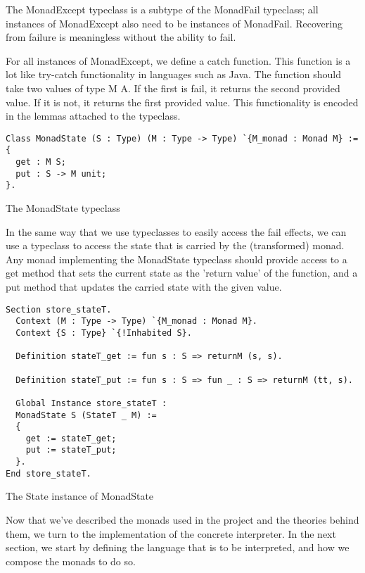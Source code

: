 The MonadExcept typeclass is a subtype of the MonadFail typeclass; all
instances of MonadExcept also need to be instances of MonadFail. Recovering
from failure is meaningless without the ability to fail.

For all instances of MonadExcept, we define a catch function. This function
is a lot like try-catch functionality in languages such as Java. The function
should take two values of type M A. If the first is fail, it returns the
second provided value. If it is not, it returns the first provided value. This
functionality is encoded in the lemmas attached to the typeclass.

\begin{listing}
\begin{verbatim}
Class MonadState (S : Type) (M : Type -> Type) `{M_monad : Monad M} :=
{
  get : M S;
  put : S -> M unit;
}.
\end{verbatim}
\caption{The MonadState typeclass}
\label{lst:monadstate}
\end{listing}

In the same way that we use typeclasses to easily access the fail effects, we 
can use a typeclass to access the state that is carried by the (transformed)
monad. Any monad implementing the MonadState typeclass should provide access to
a get method that sets the current state as the 'return value' of the function,
and a put method that updates the carried state with the given value.

\begin{listing}
\begin{verbatim}
Section store_stateT.
  Context (M : Type -> Type) `{M_monad : Monad M}.
  Context {S : Type} `{!Inhabited S}.

  Definition stateT_get := fun s : S => returnM (s, s).

  Definition stateT_put := fun s : S => fun _ : S => returnM (tt, s).

  Global Instance store_stateT : 
  MonadState S (StateT _ M) :=
  {
    get := stateT_get;
    put := stateT_put;
  }.
End store_stateT.
\end{verbatim}
\caption{The State instance of MonadState}
\label{lst:monadstate_state}
\end{listing}

Now that we've described the monads used in the project and the 
theories behind them, we turn to the implementation of the concrete
interpreter. In the next section, we start by defining the language that is to
be interpreted, and how we compose the monads to do so.

